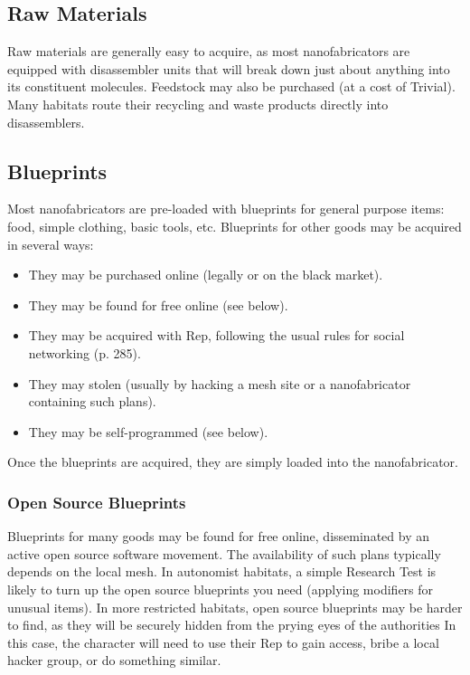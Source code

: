 \subsection{Raw Materials} 

Raw materials are generally easy to acquire, as most nanofabricators are equipped with disassembler units that will break down just about anything into its constituent molecules. Feedstock may also be purchased (at a cost of Trivial). Many habitats route their recycling and waste products directly into disassemblers. 

\subsection{Blueprints} 

Most nanofabricators are pre-loaded with blueprints for general purpose items: food, simple clothing, basic tools, etc. Blueprints for other goods may be acquired in several ways: 

\begin{itemize} \item They may be purchased online (legally or on the black market). \item They may be found for free online (see below). \item They may be acquired with Rep, following the usual rules for social networking (p. 285). \item They may stolen (usually by hacking a mesh site or a nanofabricator containing such plans). \item They may be self-programmed (see below). \end{itemize} 

\noindent Once the blueprints are acquired, they are simply loaded into the nanofabricator. 

\subsubsection{Open Source Blueprints} 

Blueprints for many goods may be found for free online, disseminated by an active open source software movement. The availability of such plans typically depends on the local mesh. In autonomist habitats, a simple Research Test is likely to turn up the open source blueprints you need (applying modifiers for unusual items). In more restricted habitats, open source blueprints may be harder to find, as they will be securely hidden from the prying eyes of the authorities In this case, the character will need to use their Rep to gain access, bribe a local hacker group, or do something similar. 

